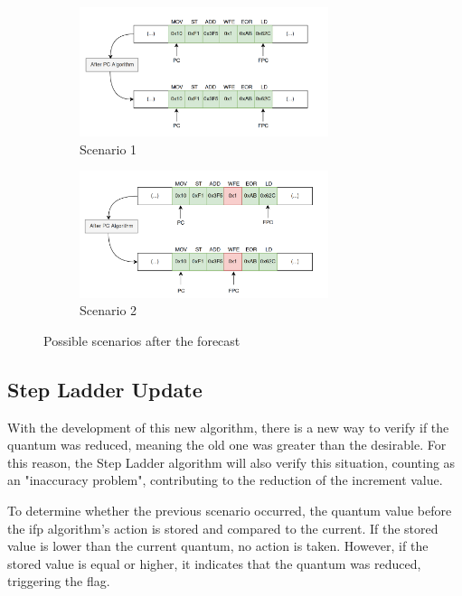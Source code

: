 \begin{figure} [H]
\centering
\begin{subfigure}{\textwidth}
    \includegraphics[width=0.8\textwidth]{Images/PCAlgrithm_noCut.png}
    \caption{ Scenario 1 }
    \label{fig:PCAlgrithm_noCut}
\end{subfigure}
\begin{subfigure}{\textwidth}
    \includegraphics[width=0.8\textwidth]{Images/PCAlgrithm_Cut.png}
    \caption{ Scenario 2 }
    \label{fig:PCAlgrithm_Cut}
\end{subfigure}
        
\caption{Possible scenarios after the forecast}
\label{fig:PCAlgorithm_differentScenarios}
\end{figure}

\subsection{Step Ladder Update}

With the development of this new algorithm, there is a new way to verify if the quantum was reduced, meaning the old one was greater 
than the desirable. For this reason, the Step Ladder algorithm will also verify this situation, counting as an "inaccuracy problem", contributing 
to the reduction of the increment value.

To determine whether the previous scenario occurred, the quantum value before the \gls{ifp} algorithm's action is stored and compared to the current. 
If the stored value is lower than the current quantum, no action is taken. However, if the stored value is equal or higher, it indicates that 
the quantum was reduced, triggering the flag. 


